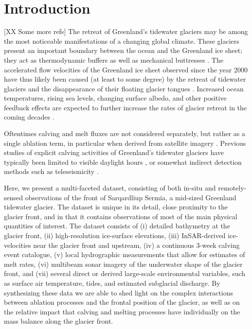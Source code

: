 \documentclass[30pt,letterpaper]{article}
\begin{document}
\section{Introduction}
 
[XX Some more refs] The retreat of Greenland's tidewater glaciers may be among the most noticeable manifestations of a changing global climate. These glaciers present an important boundary between the ocean and the Greenland ice sheet; they act as thermodynamic buffers as well as mechanical buttresses \citep[e.g.,][]{Rignot:2002kz, Howat:2007di, Nick:2009gz}. The accelerated flow velocities of the Greenland ice sheet observed since the year 2000 \citep{Howat:2008hp, Moon:2012iy} have thus likely been caused (at least to some degree) by the retreat of tidewater glaciers and the disappearance of their floating glacier tongues \cite{Wilson:2017bh}. Increased ocean temperatures, rising sea levels, changing surface albedo, and other positive feedback effects are expected to further increase the rates of glacier retreat in the coming decades \citep[e.g.,][]{Vieli:2011hw, Joughin:2012hc, Nick:2013jp}. 

Oftentimes calving and melt fluxes are not considered separately, but rather as a single ablation term, in particular when derived from satellite imagery \cite{Luckman:2015ip}. Previous studies of explicit calving activities of Greenland's tidewater glaciers have typically been limited to visible daylight hours \citep[see, for example, the calving event catalogue of][]{Astrom:2014ee}, or somewhat indirect detection methods such as teleseismicity \citep{Veitch:2012hn}. 

Here, we present a multi-faceted dataset, consisting of both in-situ and remotely-sensed observations of the front of Sarqardliup Sermia, a mid-sized Greenland tidewater glacier. The dataset is unique in its detail, close proximity to the glacier front, and in that it contains observations of most of the main physical quantities of interest. The dataset consists of (i) detailed bathymetry at the glacier front, (ii) high-resolution ice-surface elevations, (iii) InSAR-derived ice-velocities near the glacier front and upstream, (iv) a continuous 3-week calving event catalogue, (v) local hydrographic measurements that allow for estimates of melt rates, (vi) multibeam sonar imagery of the underwater shape of the glacier front, and (vii) several direct or derived large-scale environmental variables, such as surface air temperature, tides, and estimated subglacial discharge. By synthesizing these data we are able to shed light on the complex interactions between ablation processes and the frontal position of the glacier, as well as on the relative impact that calving and melting processes have individually on the mass balance along the glacier front. 
\end{document}

